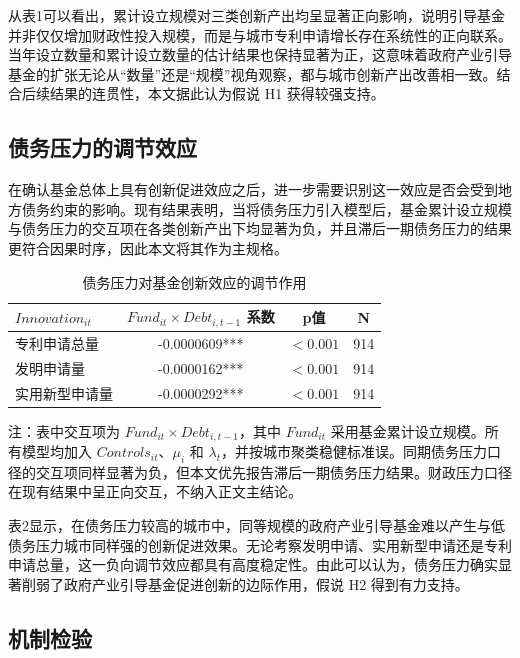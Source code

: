 从表1可以看出，累计设立规模对三类创新产出均呈显著正向影响，说明引导基金并非仅仅增加财政性投入规模，而是与城市专利申请增长存在系统性的正向联系。当年设立数量和累计设立数量的估计结果也保持显著为正，这意味着政府产业引导基金的扩张无论从“数量”还是“规模”视角观察，都与城市创新产出改善相一致。结合后续结果的连贯性，本文据此认为假说 H1 获得较强支持。

\subsection{债务压力的调节效应}

在确认基金总体上具有创新促进效应之后，进一步需要识别这一效应是否会受到地方债务约束的影响。现有结果表明，当将债务压力引入模型后，基金累计设立规模与债务压力的交互项在各类创新产出下均显著为负，并且滞后一期债务压力的结果更符合因果时序，因此本文将其作为主规格。

\begin{table}[htbp]
  \centering
  \caption{债务压力对基金创新效应的调节作用}
  {\fangsong{}
  \begin{tabularx}{0.94\linewidth}{l c c c}
    \toprule
    $Innovation_{it}$ & $Fund_{it}\times Debt_{i,t-1}$ 系数 & p值 & N \\
    \midrule
    专利申请总量 & -0.0000609*** & $<0.001$ & 914 \\
    发明申请量 & -0.0000162*** & $<0.001$ & 914 \\
    实用新型申请量 & -0.0000292*** & $<0.001$ & 914 \\
    \bottomrule
  \end{tabularx}

  \par\smallskip
  {\songti{}注：表中交互项为 $Fund_{it}\times Debt_{i,t-1}$，其中 $Fund_{it}$ 采用基金累计设立规模。所有模型均加入 $Controls_{it}$、$\mu_i$ 和 $\lambda_t$，并按城市聚类稳健标准误。同期债务压力口径的交互项同样显著为负，但本文优先报告滞后一期债务压力结果。财政压力口径在现有结果中呈正向交互，不纳入正文主结论。}
  }
\end{table}

表2显示，在债务压力较高的城市中，同等规模的政府产业引导基金难以产生与低债务压力城市同样强的创新促进效果。无论考察发明申请、实用新型申请还是专利申请总量，这一负向调节效应都具有高度稳定性。由此可以认为，债务压力确实显著削弱了政府产业引导基金促进创新的边际作用，假说 H2 得到有力支持。

\subsection{机制检验}

